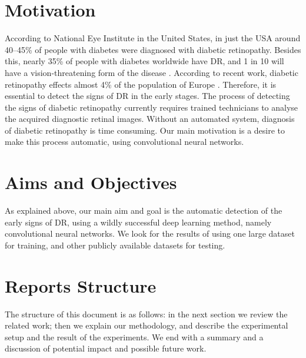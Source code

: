 \section{Motivation}
According to National Eye Institute in the United States, in just the USA around 40--45\% of people with diabetes were diagnosed with diabetic retinopathy. Besides this, nearly 35\% of people with diabetes worldwide have DR, and 1 in 10 will have a vision-threatening form of the disease \citep{yau2012global}. According to recent work, diabetic retinopathy effects almost 4\% of the population of Europe \citep{nentwich2015diabetic}. Therefore, it is essential to detect the signs of DR in the early stages. The process of detecting the signs of diabetic retinopathy currently requires trained technicians to analyse the acquired diagnostic retinal images. Without an automated system, diagnosis of diabetic retinopathy is time consuming. Our main motivation is a desire to make this process automatic, using convolutional neural networks.

\section{Aims and Objectives}
As explained above, our main aim and goal is the automatic detection of the early signs of DR, using a wildly successful deep learning method, namely convolutional neural networks. We look for the results of using one large dataset for training, and other publicly available datasets for testing. 

\section{Reports Structure}
The structure of this document is as follows: in the next section we review the related work; then we explain our methodology, and describe the experimental setup and the result of the experiments. We end with a summary and a discussion of potential impact and possible future work.